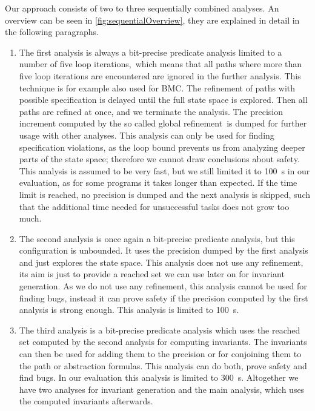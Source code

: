 Our approach consists of two to three sequentially combined analyses. An overview can be seen in \autoref{fig:sequentialOverview}, they are explained in detail in the following paragraphs.
\begin{enumerate}
 \item \label{item:firstanalysis}The first analysis is always a bit-precise predicate analysis limited to a number of five loop iterations,\, which means that all paths where more than five loop iterations are encountered are ignored in the further
 analysis. This technique is for example also used for \ac{BMC}. The refinement of paths with possible specification is delayed until the full state space is explored. Then
 all paths are refined at once, and we terminate the analysis. The precision increment computed by the so called global refinement\, is dumped for further usage with other analyses. This analysis can only be used for finding specification
 violations, as the loop bound prevents us from analyzing deeper parts of the state space; therefore we cannot draw conclusions about safety. This analysis is assumed to be very
 fast, but we still limited it to \SI{100}{\second} in our evaluation, as for some programs it takes longer than expected. If the time limit is reached, no precision is dumped and
 the next analysis is skipped, such that the additional time needed for unsuccessful tasks does not grow too much.
 
 \item The second analysis is once again a bit-precise predicate analysis, but this configuration is unbounded. It uses the precision dumped by the first analysis and just explores
 the state space. This analysis does not use any refinement, its aim is just to provide a reached set we can use later on for invariant generation. As we do not use any refinement,
 this analysis cannot be used for finding bugs, instead it can prove safety if the precision computed by the first analysis is strong enough. This analysis is limited to \SI{100}{\second}.
 
 \item The third analysis is a bit-precise predicate analysis which uses the reached set computed by the second analysis for computing invariants. The invariants can then be used
 for adding them to the precision or for conjoining them to the path or abstraction formulas. This analysis can do both, prove safety and find bugs. In our evaluation this analysis
 is limited to \SI{300}{\second}. Altogether we have two analyses for invariant generation and the main analysis, which uses the computed invariants afterwards.\label{item:thirdanalysis}
\end{enumerate}


